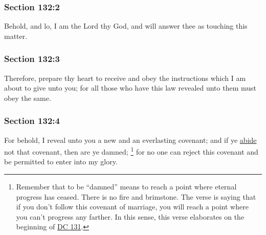 	\subsubsection{Section 132:2} %
		\label{DC132-2}

		Behold, and lo, I am the Lord thy God, and will answer thee as touching this matter.


	\subsubsection{Section 132:3} %
		\label{DC132-3}

		Therefore, prepare thy heart to receive and obey the instructions which I am about to give unto you; for all those who have this law revealed unto them must obey the same.


	\subsubsection{Section 132:4} %
		\label{DC132-4}

		For behold, I reveal unto you a new and an everlasting covenant; and if ye \hyperref[ABIDE]{abide} not that covenant, then are ye damned;%
			\footnote{%
				Remember that to be ``damned'' means to reach a point where eternal progress has ceased. There is no fire and brimstone. The verse is saying that if you don't follow this covenant of marriage, you will reach a point where you can't progress any farther. In this sense, this verse elaborates on the beginning of \hyperref[DC131-1]{DC 131}.
				}
		for no one can reject this covenant and be permitted to enter into my glory.

